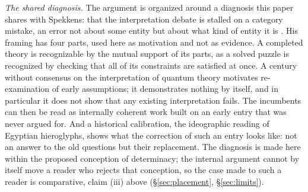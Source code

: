 \textit{The shared diagnosis.} The argument is organized around a diagnosis this paper shares with Spekkens: that the interpretation debate is stalled on a category mistake, an error not about some entity but about what kind of entity it is \cite{spekkens2018quantum}. His framing has four parts, used here as motivation and not as evidence. A completed theory is recognizable by the mutual support of its parts, as a solved puzzle is recognized by checking that all of its constraints are satisfied at once. A century without consensus on the interpretation of quantum theory motivates re-examination of early assumptions; it demonstrates nothing by itself, and in particular it does not show that any existing interpretation fails. The incumbents can then be read as internally coherent work built on an early entry that was never argued for. And a historical calibration, the ideographic reading of Egyptian hieroglyphs, shows what the correction of such an entry looks like: not an answer to the old questions but their replacement. The diagnosis is made here within the proposed conception of determinacy; the internal argument cannot by itself move a reader who rejects that conception, so the case made to such a reader is comparative, claim (iii) above (\S\ref{sec:placement}, \S\ref{sec:limits}).

